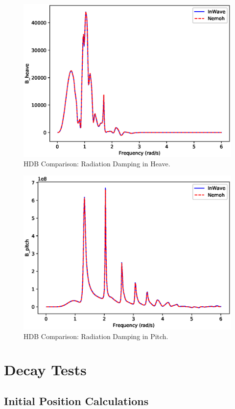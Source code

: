 \documentclass[11pt]{article}
\begin{document}
\begin{figure}[htbp]
\centering
\includegraphics[width=.9\linewidth]{images/hdb/B_heave.eps}
\caption{HDB Comparison: Radiation Damping in Heave.}
\end{figure}

\begin{figure}[htbp]
\centering
\includegraphics[width=.9\linewidth]{images/hdb/B_pitch.eps}
\caption{HDB Comparison: Radiation Damping in Pitch.}
\end{figure}




\clearpage
\clearpage
\section{Decay Tests}
\label{sec:orgdfa82f3}
\subsection{Initial Position Calculations}
\label{sec:org731c339}
\end{document}
